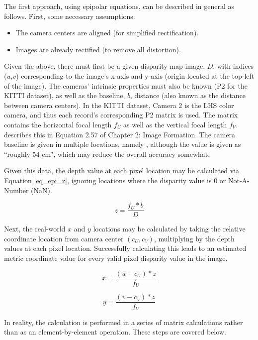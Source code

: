 The first approach, using epipolar equations, can be described in general as follows. First, some necessary assumptions:
\begin{itemize} \itemsep=-0.5em
	\item The camera centers are aligned (for simplified rectification).
	\item Images are already rectified (to remove all distortion).
\end{itemize}

Given the above, there must first be a given disparity map image, $D$, with indices ($u$,$v$) corresponding to the image's x-axis and y-axis (origin located at the top-left of the image). The cameras' intrinsic properties must also be known (P2 for the KITTI dataset), as well as the baseline, $b$, distance (also known as the distance between camera centers). In the KITTI dataset, Camera 2 is the LHS color camera, and thus each record's corresponding P2 matrix is used. The matrix contains the horizontal focal length $f_U$ as well as the vertical focal length $f_V$. \cite{szeliski_computer_2010} describes this in Equation 2.57 of Chapter 2: Image Formation. The camera baseline is given in multiple locations, namely \cite{geiger_are_2012}, although the value is given as ``roughly 54 cm", which may reduce the overall accuracy somewhat.

Given this data, the depth value at each pixel location may be calculated via Equation \ref{eq_epi_z}, ignoring locations where the disparity value is 0 or Not-A-Number (NaN).

\begin{equation}
z = \frac{f_U * b}{D}
\label{eq_epi_z}
\end{equation}

Next, the real-world $x$ and $y$ locations may be calculated by taking the relative coordinate location from camera center $(c_U,c_V)$, multiplying by the depth values at each pixel location. Successfully calculating this leads to an estimated metric coordinate value for every valid pixel disparity value in the image.

\begin{equation}
x = \frac{(u - c_U) * z}{f_U}
\end{equation}

\begin{equation}
y = \frac{(v - c_V) * z}{f_V}
\end{equation}

In reality, the calculation is performed in a series of matrix calculations rather than as an element-by-element operation. These steps are covered below.
 
